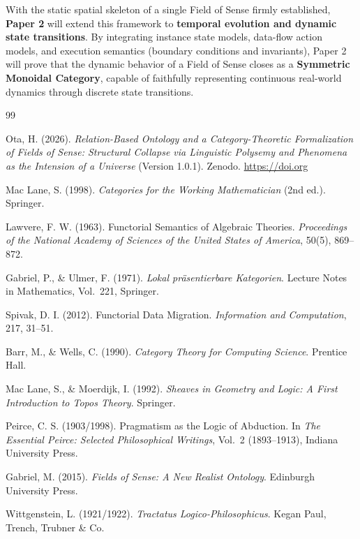 \documentclass[11pt,a4paper]{article}
\theoremstyle{definition}
\theoremstyle{plain}
\theoremstyle{remark}
\begin{document}
With the static spatial skeleton of a single Field of Sense firmly established, \textbf{Paper 2} will extend this framework to \textbf{temporal evolution and dynamic state transitions}. By integrating instance state models, data-flow action models, and execution semantics (boundary conditions and invariants), Paper 2 will prove that the dynamic behavior of a Field of Sense closes as a \textbf{Symmetric Monoidal Category}, capable of faithfully representing continuous real-world dynamics through discrete state transitions.

\begin{thebibliography}{99}

Ota, H. (2026).
\emph{Relation-Based Ontology and a Category-Theoretic Formalization of Fields of Sense: Structural Collapse via Linguistic Polysemy and Phenomena as the Intension of a Universe} (Version 1.0.1).
Zenodo. \url{https://doi.org}

Mac Lane, S. (1998).
\emph{Categories for the Working Mathematician} (2nd ed.).
Springer.

Lawvere, F. W. (1963).
Functorial Semantics of Algebraic Theories.
\emph{Proceedings of the National Academy of Sciences of the United States of America}, 50(5), 869--872.

Gabriel, P., \& Ulmer, F. (1971).
\emph{Lokal pr\"asentierbare Kategorien}.
Lecture Notes in Mathematics, Vol.~221, Springer.

Spivak, D. I. (2012).
Functorial Data Migration.
\emph{Information and Computation}, 217, 31--51.

Barr, M., \& Wells, C. (1990).
\emph{Category Theory for Computing Science}.
Prentice Hall.

Mac Lane, S., \& Moerdijk, I. (1992).
\emph{Sheaves in Geometry and Logic: A First Introduction to Topos Theory}.
Springer.

Peirce, C. S. (1903/1998).
Pragmatism as the Logic of Abduction.
In \emph{The Essential Peirce: Selected Philosophical Writings}, Vol.~2 (1893--1913), Indiana University Press.

Gabriel, M. (2015).
\emph{Fields of Sense: A New Realist Ontology}.
Edinburgh University Press.

Wittgenstein, L. (1921/1922).
\emph{Tractatus Logico-Philosophicus}.
Kegan Paul, Trench, Trubner \& Co.


\end{thebibliography}
\end{document}
